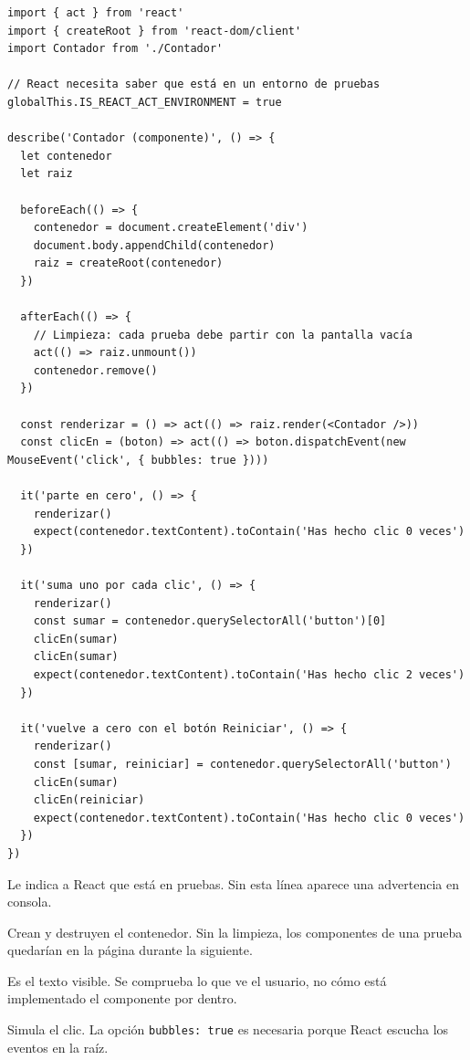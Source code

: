 \documentclass[11pt,a4paper]{article}
\newcommand{\cmd}[1]{\texttt{\color{reactdark}#1}}
\begin{document}
\begin{lstlisting}[language=JSX,title={\small\ttfamily src/components/basicos/Contador.spec.jsx}]
import { act } from 'react'
import { createRoot } from 'react-dom/client'
import Contador from './Contador'

// React necesita saber que está en un entorno de pruebas
globalThis.IS_REACT_ACT_ENVIRONMENT = true

describe('Contador (componente)', () => {
  let contenedor
  let raiz

  beforeEach(() => {
    contenedor = document.createElement('div')
    document.body.appendChild(contenedor)
    raiz = createRoot(contenedor)
  })

  afterEach(() => {
    // Limpieza: cada prueba debe partir con la pantalla vacía
    act(() => raiz.unmount())
    contenedor.remove()
  })

  const renderizar = () => act(() => raiz.render(<Contador />))
  const clicEn = (boton) => act(() => boton.dispatchEvent(new MouseEvent('click', { bubbles: true })))

  it('parte en cero', () => {
    renderizar()
    expect(contenedor.textContent).toContain('Has hecho clic 0 veces')
  })

  it('suma uno por cada clic', () => {
    renderizar()
    const sumar = contenedor.querySelectorAll('button')[0]
    clicEn(sumar)
    clicEn(sumar)
    expect(contenedor.textContent).toContain('Has hecho clic 2 veces')
  })

  it('vuelve a cero con el botón Reiniciar', () => {
    renderizar()
    const [sumar, reiniciar] = contenedor.querySelectorAll('button')
    clicEn(sumar)
    clicEn(reiniciar)
    expect(contenedor.textContent).toContain('Has hecho clic 0 veces')
  })
})
\end{lstlisting}

\begin{description}[leftmargin=0pt, style=nextline, itemsep=0.4em]
\item[\texttt{IS\_REACT\_ACT\_ENVIRONMENT}] Le indica a React que está en pruebas. Sin esta línea aparece una advertencia en consola.
\item[\texttt{beforeEach} y \texttt{afterEach}] Crean y destruyen el contenedor. Sin la limpieza, los componentes de una prueba quedarían en la página durante la siguiente.
\item[\texttt{contenedor.textContent}] Es el texto visible. Se comprueba lo que ve el usuario, no cómo está implementado el componente por dentro.
\item[\texttt{dispatchEvent}] Simula el clic. La opción \cmd{bubbles: true} es necesaria porque React escucha los eventos en la raíz.
\end{description}
\end{document}
